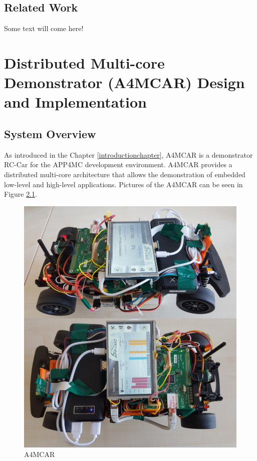 

\section{Related Work}
Some text will come here! \\

\chapter{Distributed Multi-core Demonstrator (A4MCAR) Design and Implementation} \label{designchapter}
\section{System Overview}
As introduced in the Chapter \ref{introductionchapter}, A4MCAR is a demonstrator RC-Car for the APP4MC development environment. A4MCAR provides a distributed multi-core architecture that allows the demonstration of embedded low-level and high-level applications. Pictures of the A4MCAR can be seen in Figure \ref{fig:a4mcar}.
\begin{figure}[!ht]
	\centering
	\captionsetup{justification=centering}
	\includegraphics[scale=0.4]{content/images/a4mcar.png}
	\caption{A4MCAR}
	\label{fig:a4mcar}
\end{figure}
